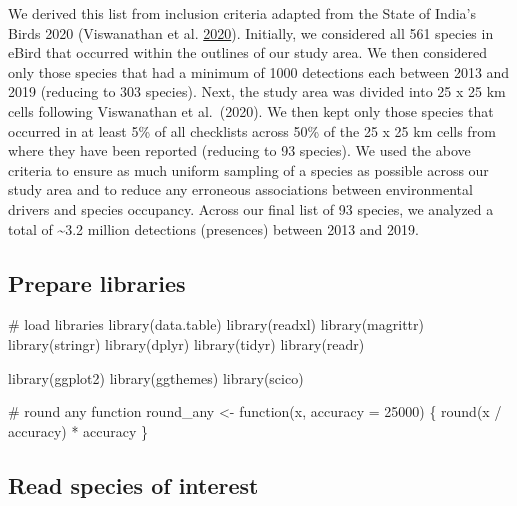 \documentclass[]{article}
\newenvironment{Shaded}{}{}
\newcommand{\CommentTok}[1]{\textcolor[rgb]{0.00,0.50,0.00}{#1}}
\newcommand{\ControlFlowTok}[1]{\textcolor[rgb]{0.00,0.00,1.00}{#1}}
\newcommand{\DataTypeTok}[1]{#1}
\newcommand{\DecValTok}[1]{#1}
\newcommand{\KeywordTok}[1]{\textcolor[rgb]{0.00,0.00,1.00}{#1}}
\newcommand{\NormalTok}[1]{#1}
\newcommand{\OperatorTok}[1]{#1}
\newcommand{\StringTok}[1]{\textcolor[rgb]{0.00,0.50,0.50}{#1}}
\begin{document}
We derived this list from inclusion criteria adapted from the State of India's Birds 2020 (Viswanathan et al. \protect\hyperlink{ref-viswanathan2020}{2020}). Initially, we considered all 561 species in eBird that occurred within the outlines of our study area. We then considered only those species that had a minimum of 1000 detections each between 2013 and 2019 (reducing to 303 species). Next, the study area was divided into 25 x 25 km cells following Viswanathan et al.~(2020). We then kept only those species that occurred in at least 5\% of all checklists across 50\% of the 25 x 25 km cells from where they have been reported (reducing to 93 species). We used the above criteria to ensure as much uniform sampling of a species as possible across our study area and to reduce any erroneous associations between environmental drivers and species occupancy. Across our final list of 93 species, we analyzed a total of \textasciitilde{}3.2 million detections (presences) between 2013 and 2019.

\hypertarget{prepare-libraries}{%
\subsection{Prepare libraries}\label{prepare-libraries}}

\begin{Shaded}
\begin{Highlighting}[numbers=left,,]
\CommentTok{# load libraries}
\KeywordTok{library}\NormalTok{(data.table)}
\KeywordTok{library}\NormalTok{(readxl)}
\KeywordTok{library}\NormalTok{(magrittr)}
\KeywordTok{library}\NormalTok{(stringr)}
\KeywordTok{library}\NormalTok{(dplyr)}
\KeywordTok{library}\NormalTok{(tidyr)}
\KeywordTok{library}\NormalTok{(readr)}

\KeywordTok{library}\NormalTok{(ggplot2)}
\KeywordTok{library}\NormalTok{(ggthemes)}
\KeywordTok{library}\NormalTok{(scico)}

\CommentTok{# round any function}
\NormalTok{round_any <-}\StringTok{ }\ControlFlowTok{function}\NormalTok{(x, }\DataTypeTok{accuracy =} \DecValTok{25000}\NormalTok{) \{}
  \KeywordTok{round}\NormalTok{(x }\OperatorTok{/}\StringTok{ }\NormalTok{accuracy) }\OperatorTok{*}\StringTok{ }\NormalTok{accuracy}
\NormalTok{\}}
\end{Highlighting}
\end{Shaded}

\hypertarget{read-species-of-interest}{%
\subsection{Read species of interest}\label{read-species-of-interest}}
\end{document}
